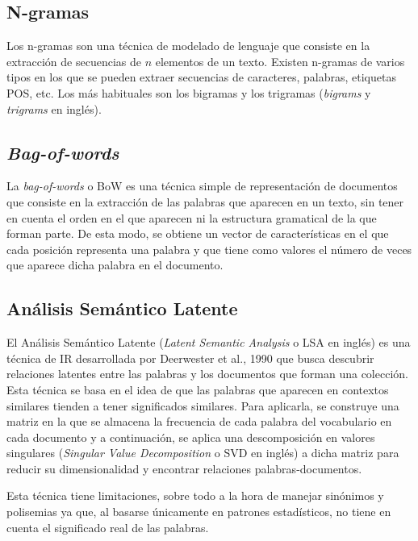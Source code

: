 \subsection{N-gramas}

Los n-gramas son una técnica de modelado de lenguaje que consiste en la extracción de secuencias de $n$ elementos de un texto. Existen n-gramas de varios tipos
en los que se pueden extraer secuencias de caracteres, palabras, etiquetas POS, etc. Los más habituales son los bigramas y los trigramas (\textit{bigrams} y \textit{trigrams} en inglés).

\subsection{\textit{Bag-of-words}}

La \textit{bag-of-words} o BoW es una técnica simple de representación de documentos que consiste en la extracción de las palabras que aparecen en un texto,
sin tener en cuenta el orden en el que aparecen ni la estructura gramatical de la que forman parte. De esta modo, se obtiene un vector de características en el 
que cada posición representa una palabra y que tiene como valores el número de veces que aparece dicha palabra en el documento.

\subsection{Análisis Semántico Latente}
\label{sec:analisis_semantico_latente}

El Análisis Semántico Latente (\textit{Latent Semantic Analysis} o LSA en inglés) es una técnica de IR desarrollada por Deerwester et al., 1990 \cite{deerwester1990indexing}
que busca descubrir relaciones latentes
entre las palabras y los documentos que forman una colección. Esta técnica se basa
en el idea de que las palabras que aparecen en contextos similares
tienden a tener significados similares. Para aplicarla, se construye una matriz en la que se almacena la frecuencia de cada palabra del vocabulario en cada documento y
a continuación, se aplica una descomposición en valores singulares (\textit{Singular Value Decomposition} o SVD en inglés) a dicha matriz para reducir su dimensionalidad
y encontrar relaciones palabras-documentos.

\bigskip
Esta técnica tiene limitaciones, sobre todo a la hora de manejar sinónimos y polisemias ya que, al basarse únicamente en patrones estadísticos,
no tiene en cuenta el significado real de las palabras.

